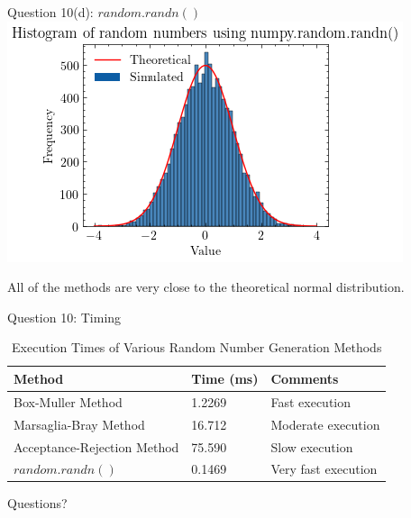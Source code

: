 \documentclass[compress,12pt]{beamer}
\begin{document}
\begin{frame}{Question 10(d): $random.randn()$}
\centering
\includegraphics[scale=0.7]{imgs/numpyrandomrv.png}  \\
\begin{tcolorbox}
    All of the methods are very close to the theoretical normal distribution.  
\end{tcolorbox}

\end{frame}

\begin{frame}{Question 10: Timing}

\begin{table}[htbp]
\centering
\caption{Execution Times of Various Random Number Generation Methods}
\label{tab:execution_times}
\begin{tabular}{@{}lll@{}}
\toprule
Method & Time (ms) & Comments \\ \midrule
Box-Muller Method & 1.2269 & Fast execution \\
Marsaglia-Bray Method & 16.712 & Moderate execution \\
Acceptance-Rejection Method & 75.590 & Slow execution \\
$random.randn()$ & 0.1469 & Very fast execution \\ \bottomrule
\end{tabular}
\end{table}
    
\end{frame}



\End
\begin{frame}
      \centering
      Questions?
\end{frame}
\end{document}
